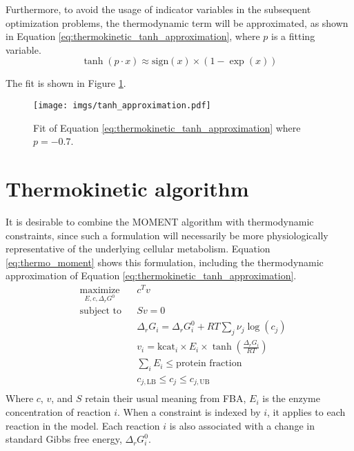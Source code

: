 Furthermore, to avoid the usage of indicator variables in the subsequent optimization
problems, the thermodynamic term will be approximated, as shown in Equation
\ref{eq:thermokinetic_tanh_approximation}, where $p$ is a fitting variable.
\begin{equation}
    \tanh \left(p \cdot x \right) \approx  \text{sign}\left( x \right) \times \left(1 - \exp \left( x \right)\right)
    \label{eq:thermokinetic_tanh_approximation}
\end{equation}

The fit is shown in Figure \ref{fig:tanh_approximation}.
\begin{figure}[H]
    \centering
    \texttt{[image: imgs/tanh\_approximation.pdf]}
    \caption{Fit of Equation \ref{eq:thermokinetic_tanh_approximation} where $p=-0.7$.}
    \label{fig:tanh_approximation}
\end{figure}

\section{Thermokinetic algorithm}
It is desirable to combine the MOMENT algorithm \cite{adadi2012prediction} with thermodynamic
constraints, since such a formulation will necessarily be more physiologically representative
of the underlying cellular metabolism. Equation \ref{eq:thermo_moment} shows this formulation,
including the thermodynamic approximation of Equation \ref{eq:thermokinetic_tanh_approximation}.
\begin{equation}
\begin{aligned}
& \underset{E, c, \Delta_r G^0}{\text{maximize}}
& & c^T v \\
& \text{subject to}
& & S v = 0 \\
& & & \Delta_r G_i = \Delta_r G_i^0 + R T \sum_j\nu_j\log\left(c_j \right) \\
& & & v_i = \text{kcat}_i \times E_i \times \tanh \left(\frac{\Delta_r G_i}{RT} \right)\\
& & & \sum_i E_i \leq \text{protein fraction}\\
& & & c_{j, \text{LB}} \leq c_j \leq c_{j, \text{UB}}\\
\end{aligned}
\label{eq:thermo_moment}
\end{equation}
Where $c$, $v$, and $S$ retain their usual meaning from FBA, $E_i$ is the enzyme
concentration of reaction $i$. When a constraint is indexed by $i$, it applies to each
reaction in the model. Each reaction $i$ is also associated with a change in standard Gibbs free
energy, $\Delta_r G_i^0$.



